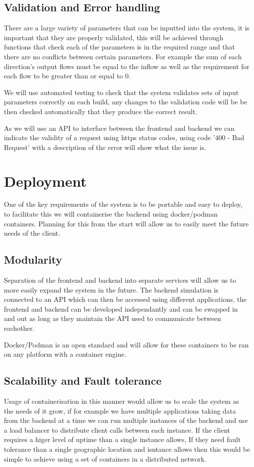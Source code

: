 \documentclass{article}
\begin{document}
\subsection{Validation and Error handling}

There are a large variety of parameters that can be inputted into the system, it is 
important that they are properly validated, this will be achieved through functions 
that check each of the parameters is in the required range and that there are no 
conflicts between certain parameters. For example the sum of each direction's output 
flows must be equal to the inflow as well as the requirement for each flow to be 
greater than or equal to 0. 

We will use automated testing to check that the system validates sets of input 
parameters correctly on each build, any changes to the validation code will be be then 
checked automatically that they produce the correct result. 

As we will use an API to interface between the frontend and backend we can indicate 
the validity of a request using https status codes, using code '400 - Bad Request' 
with a description of the error will show what the issue is.

\section{Deployment}
One of the key requirements of the system is to be portable and easy to deploy, 
to facilitate this we will containerise the backend using docker/podman containers. 
Planning for this from the start will allow us to easily meet the future needs of the 
client. 

\subsection{Modularity}
Separation of the frontend and backend into separate services will allow us to more 
easily expand the system in the future. The backend simulation is connected to an API 
which can then be accessed using different applications, the frontend and backend can 
be developed independantly and can be swapped in and out as long as they maintain the 
API used to communicate between eachother.

Docker/Podman is an open standard and will allow for these containers to be ran 
on any platform with a container engine.

\subsection{Scalability and Fault tolerance}
Usage of containerisation in this manner would allow us to scale the system as the 
needs of it grow, if for example we have multiple applications taking data from the 
backend at a time we can run multiple instances of the backend and use a load balancer 
to distribute client calls between each instance. If the client requires a higer level 
of uptime than a single instance allows, If they need fault tolerance than a single 
geographic location and isntance allows then this would be simple to achieve using a 
set of containers in a distributed network.
\end{document}
